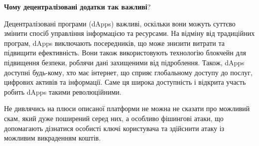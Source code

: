 \begin{remark}
    \textbf{Чому децентралізовані додатки так важливі}?

    Децентралізовані програми (dApps) важливі, оскільки вони можуть суттєво змінити спосіб управління інформацією та ресурсами. На відміну від традиційних програм, dApps виключають посередників, що може знизити витрати та підвищити ефективність. Вони також використовують технологію блокчейн для підвищення безпеки, роблячи дані захищеними від підроблення. Також, dApps доступні будь-кому, хто має інтернет, що сприяє глобальному доступу до послуг, цифрових активів та інформації. Саме ця широка доступність і відкрита участь робить dApps такими революційними.
\end{remark}

Не дивлячись на плюси описаної платформи не можна не сказати про можливий скам, який дуже поширений серед них, а особливо фішингові атаки, що допомагають дізнатися особисті ключі користувача та здійснити атаку із можливим викраденням коштів. 

